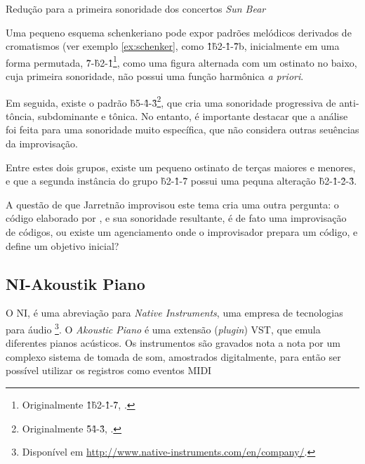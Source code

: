 \begin{example}{Redução para a primeira sonoridade dos concertos \emph{Sun Bear}}\label{ex:schenker}

Uma pequeno esquema schenkeriano pode expor padrões melódicos derivados de cromatismos   (ver exemplo \ref{ex:schenker}, como \^1\^b2-\^1-\^7b, inicialmente em uma forma permutada, \^7-\^{b2}-\^1\footnote{Originalmente \^1\^b2-\^1-\^7, .}, como uma figura alternada com um ostinato no baixo, cuja primeira sonoridade, não possui uma função harmônica \emph{a priori}.

Em seguida, existe o padrão \^{b5}-\^4-\^3\footnote{Originalmente \^5\^4-\^3, .}, que cria uma sonoridade progressiva de anti-tôncia, subdominante e tônica. No entanto, é importante destacar que a análise foi feita para uma sonoridade muito específica, que não considera outras seuências da improvisação.  

Entre estes dois grupos, existe um pequeno ostinato de terças maiores e menores, e que a segunda instância do grupo  \^{b2}-\^1-\^7 possui uma pequna alteração \^{b2}-\^1-\^2-\^3.

\centering{}
\end{example}

A questão de que Jarretnão improvisou este tema cria uma outra pergunta: o código elaborado por , e sua sonoridade resultante, é de fato uma improvisação de códigos, ou existe um agenciamento onde o improvisador prepara um código, e define um objetivo inicial?

\subsection{NI-Akoustik Piano}\label{sec:NI}

O NI, é uma abreviação para \emph{Native Instruments}, uma empresa de tecnologias para áudio \footnote{Disponível em \url{http://www.native-instruments.com/en/company/}.}. O \emph{Akoustic Piano} é uma extensão (\emph{plugin}) VST, que emula diferentes pianos acústicos. Os instrumentos são gravados nota a nota por um complexo sistema de tomada de som, amostrados digitalmente, para então ser possível utilizar os registros como eventos MIDI

